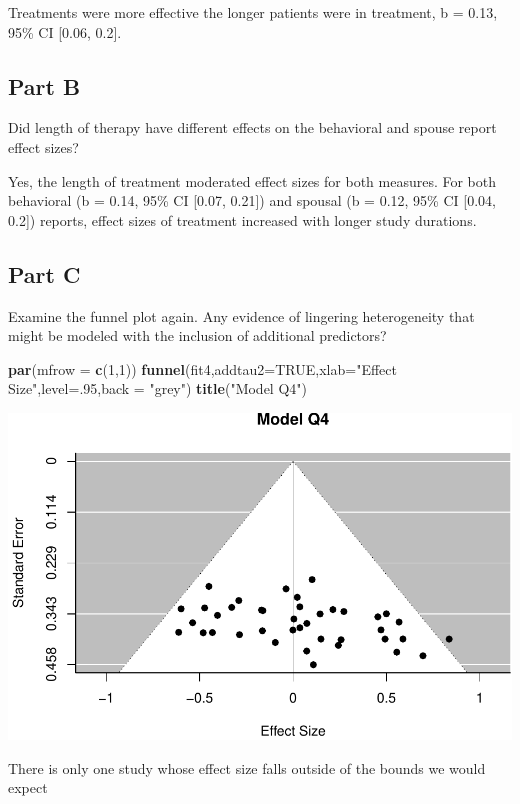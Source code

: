 \documentclass[]{article}
\newenvironment{Shaded}{\begin{snugshade}}{\end{snugshade}}
\newcommand{\KeywordTok}[1]{\textcolor[rgb]{0.13,0.29,0.53}{\textbf{#1}}}
\newcommand{\DataTypeTok}[1]{\textcolor[rgb]{0.13,0.29,0.53}{#1}}
\newcommand{\DecValTok}[1]{\textcolor[rgb]{0.00,0.00,0.81}{#1}}
\newcommand{\StringTok}[1]{\textcolor[rgb]{0.31,0.60,0.02}{#1}}
\newcommand{\OtherTok}[1]{\textcolor[rgb]{0.56,0.35,0.01}{#1}}
\newcommand{\NormalTok}[1]{#1}
\begin{document}
Treatments were more effective the longer patients were in treatment, b
= 0.13, 95\% CI {[}0.06, 0.2{]}.

\subsection{Part B}\label{part-b-3}

Did length of therapy have different effects on the behavioral and
spouse report effect sizes?

Yes, the length of treatment moderated effect sizes for both measures.
For both behavioral (b = 0.14, 95\% CI {[}0.07, 0.21{]}) and spousal (b
= 0.12, 95\% CI {[}0.04, 0.2{]}) reports, effect sizes of treatment
increased with longer study durations.

\subsection{Part C}\label{part-c-2}

Examine the funnel plot again. Any evidence of lingering heterogeneity
that might be modeled with the inclusion of additional predictors?

\begin{Shaded}
\begin{Highlighting}[]
\KeywordTok{par}\NormalTok{(}\DataTypeTok{mfrow =} \KeywordTok{c}\NormalTok{(}\DecValTok{1}\NormalTok{,}\DecValTok{1}\NormalTok{))}
\KeywordTok{funnel}\NormalTok{(fit4,}\DataTypeTok{addtau2=}\OtherTok{TRUE}\NormalTok{,}\DataTypeTok{xlab=}\StringTok{"Effect Size"}\NormalTok{,}\DataTypeTok{level=}\NormalTok{.}\DecValTok{95}\NormalTok{,}\DataTypeTok{back =} \StringTok{"grey"}\NormalTok{)}
\KeywordTok{title}\NormalTok{(}\StringTok{"Model Q4"}\NormalTok{)}
\end{Highlighting}
\end{Shaded}

\begin{center}\includegraphics{Beck_HW_9_R_1_files/figure-latex/unnamed-chunk-13-1} \end{center}

There is only one study whose effect size falls outside of the bounds we
would expect
\end{document}
